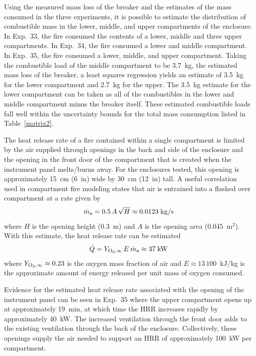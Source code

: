 Using the measured mass loss of the breaker and the estimates of the mass consumed in the three experiments, it is possible to estimate the distribution of combustible mass in the lower, middle, and upper compartments of the enclosure. In Exp.~33, the fire consumed the contents of a lower, middle and three upper compartments. In Exp.~34, the fire consumed a lower and middle compartment. In Exp.~35, the fire consumed a lower, middle, and upper compartment. Taking the combustible load of the middle compartment to be 3.7~kg, the estimated mass loss of the breaker, a least squares regression yields an estimate of 3.5~kg for the lower compartment and 2.7~kg for the upper. The 3.5~kg estimate for the lower compartment can be taken as all of the combustibles in the lower and middle compartment minus the breaker itself. These estimated combustible loads fall well within the uncertainty bounds for the total mass consumption listed in Table~\ref{matrix2}.

The heat release rate of a fire contained within a single compartment is limited by the air supplied through openings in the back and side of the enclosure and the opening in the front door of the compartment that is created when the instrument panel melts/burns away. For the enclosures tested, this opening is approximately 15~cm (6~in) wide by 30~cm (12~in) tall. A useful correlation~\cite{SFPE:Walton} used in compartment fire modeling states that air is entrained into a flashed over compartment at a rate given by
\begin{equation}
   \dot{m}_{\rm a} = 0.5  \, A \, \sqrt{H}  \approx 0.0123 \; \hbox{kg/s}
\end{equation}
where $H$ is the opening height (0.3~m) and $A$ is the opening area (0.045~m$^2$). With this estimate, the heat release rate can be estimated
\begin{equation}
   \dot{Q} = Y_{\rm O_2,\infty} \, E \, \dot{m}_{\rm a} \approx 37 \; \hbox{kW}
\end{equation}
where $Y_{\rm O_2,\infty}\approx 0.23$ is the oxygen mass fraction of air and $E\approx 13\,100$~kJ/kg is the approximate amount of energy released per unit mass of oxygen consumed.

Evidence for the estimated heat release rate associated with the opening of the instrument panel can be seen in Exp.~35 where the upper compartment opens up at approximately 19~min, at which time the HRR increases rapidly by approximately 40~kW. The increased ventilation through the front door adds to the existing ventilation through the back of the enclosure. Collectively, these openings supply the air needed to support an HRR of approximately 100~kW per compartment.


